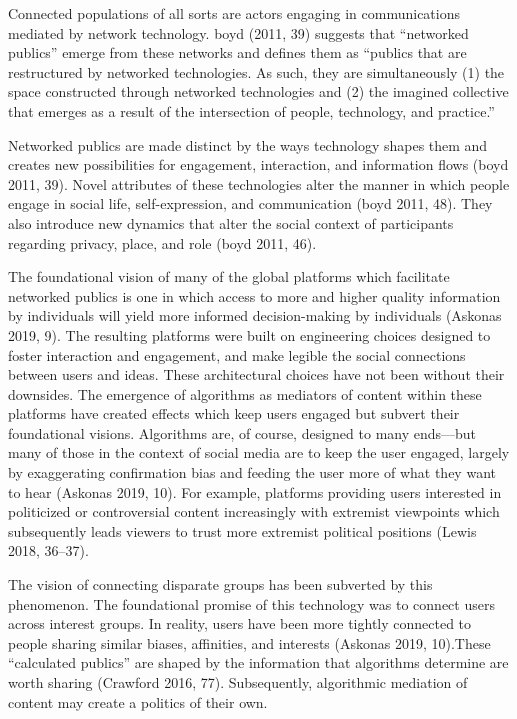 \documentclass[
]{article}
\begin{document}
Connected populations of all sorts are actors engaging in communications
mediated by network technology. boyd (2011, 39) suggests that
``networked publics'' emerge from these networks and defines them as
``publics that are restructured by networked technologies. As such, they
are simultaneously (1) the space constructed through networked
technologies and (2) the imagined collective that emerges as a result of
the intersection of people, technology, and practice.''

Networked publics are made distinct by the ways technology shapes them
and creates new possibilities for engagement, interaction, and
information flows (boyd 2011, 39). Novel attributes of these
technologies alter the manner in which people engage in social life,
self-expression, and communication (boyd 2011, 48). They also introduce
new dynamics that alter the social context of participants regarding
privacy, place, and role (boyd 2011, 46).

The foundational vision of many of the global platforms which facilitate
networked publics is one in which access to more and higher quality
information by individuals will yield more informed decision-making by
individuals (Askonas 2019, 9). The resulting platforms were built on
engineering choices designed to foster interaction and engagement, and
make legible the social connections between users and ideas. These
architectural choices have not been without their downsides. The
emergence of algorithms as mediators of content within these platforms
have created effects which keep users engaged but subvert their
foundational visions. Algorithms are, of course, designed to many
ends---but many of those in the context of social media are to keep the
user engaged, largely by exaggerating confirmation bias and feeding the
user more of what they want to hear (Askonas 2019, 10). For example,
platforms providing users interested in politicized or controversial
content increasingly with extremist viewpoints which subsequently leads
viewers to trust more extremist political positions (Lewis 2018,
36--37).

The vision of connecting disparate groups has been subverted by this
phenomenon. The foundational promise of this technology was to connect
users across interest groups. In reality, users have been more tightly
connected to people sharing similar biases, affinities, and interests
(Askonas 2019, 10).These ``calculated publics'' are shaped by the
information that algorithms determine are worth sharing (Crawford 2016,
77). Subsequently, algorithmic mediation of content may create a
politics of their own.
\end{document}
